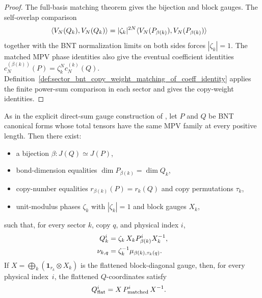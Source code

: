 \begin{proof}\leanok
    The full-basis matching theorem gives the bijection and block gauges. The
    self-overlap comparison
    \begin{align}
        \langle V_N(Q_k),V_N(Q_k)\rangle
         & =
        |\zeta_k|^{2N}
        \langle V_N(P_{\beta(k)}),V_N(P_{\beta(k)})\rangle
        \notag
    \end{align}
    together with the BNT normalization limits on both sides forces
    $|\zeta_k|=1$. The matched MPV phase identities also give the eventual
    coefficient identities
    $c_N^{(\beta(k))}(P)=\zeta_k^N c_N^{(k)}(Q)$.
    Definition~\ref{def:sector_bnt_copy_weight_matching_of_coeff_identity} applies
    the finite power-sum comparison in each sector and gives the copy-weight
    identities.
\end{proof}

\begin{lemma}%
    \label{thm:sector_bnt_equal_global_gauge}
    \leanok
    As in the explicit direct-sum gauge construction of
    \cite[Appendix MPV proof, lines~1189--1192]{Cirac2016MPDO_arXiv}, let $P$
    and $Q$ be BNT canonical forms whose total tensors have the same MPV
    family at every positive length. Then there exist:
    \begin{itemize}
        \item a bijection $\beta:J(Q)\simeq J(P)$,
        \item bond-dimension equalities
              $\dim P_{\beta(k)}=\dim Q_k$,
        \item copy-number equalities $r_{\beta(k)}(P)=r_k(Q)$ and
              copy permutations $\tau_k$,
        \item unit-modulus phases $\zeta_k$ with $|\zeta_k|=1$ and block
              gauges $X_k$,
    \end{itemize}
    such that, for every sector $k$, copy $q$, and physical index $i$,
    \begin{align}
        Q_k^i
         & = \zeta_k\,X_k P_{\beta(k)}^i X_k^{-1},
        \notag                                      \\
        \nu_{k,q}
         & = \zeta_k^{-1} \mu_{\beta(k),\tau_k(q)}.
        \notag
    \end{align}
    If $X=\bigoplus_k (\mathbf{1}_{r_k}\otimes X_k)$ is the flattened
    block-diagonal gauge, then, for every physical index~$i$, the flattened
    $Q$-coordinates satisfy
    \begin{align}
        Q_{\mathrm{flat}}^i
         & = X\,P_{\mathrm{matched}}^i\,X^{-1}.
        \notag
    \end{align}
\end{lemma}

